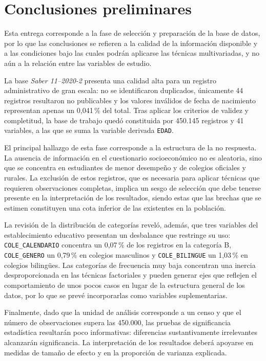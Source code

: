 \documentclass[12pt]{article}
\begin{document}
\section{Conclusiones preliminares}

Esta entrega corresponde a la fase de selección y preparación de la base de datos, por lo que las conclusiones se refieren a la calidad de la información disponible y a las condiciones bajo las cuales podrán aplicarse las técnicas multivariadas, y no aún a la relación entre las variables de estudio.

La base \textit{Saber 11--2020-2} presenta una calidad alta para un registro administrativo de gran escala: no se identificaron duplicados, únicamente 44 registros resultaron no publicables y los valores inválidos de fecha de nacimiento representan apenas un 0,041\,\% del total. Tras aplicar los criterios de validez y completitud, la base de trabajo quedó constituida por 450.145 registros y 41 variables, a las que se suma la variable derivada \texttt{EDAD}.

El principal hallazgo de esta fase corresponde a la estructura de la no respuesta. La ausencia de información en el cuestionario socioeconómico no es aleatoria, sino que se concentra en estudiantes de menor desempeño y de colegios oficiales y rurales. La exclusión de estos registros, que es necesaria para aplicar técnicas que requieren observaciones completas, implica un sesgo de selección que debe tenerse presente en la interpretación de los resultados, siendo estas que las brechas que se estimen constituyen una cota inferior de las existentes en la población.

La revisión de la distribución de categorías reveló, además, que tres variables del establecimiento educativo presentan un desbalance que restringe su uso: \texttt{COLE\_CALENDARIO} concentra un 0,07\,\% de los registros en la categoría B, \texttt{COLE\_GENERO} un 0,79\,\% en colegios masculinos y \texttt{COLE\_BILINGUE} un 1,03\,\% en colegios bilingües. Las categorías de frecuencia muy baja concentran una inercia desproporcionada en las técnicas factoriales y pueden generar ejes que reflejen el comportamiento de unos pocos casos en lugar de la estructura general de los datos, por lo que se prevé incorporarlas como variables suplementarias.

Finalmente, dado que la unidad de análisis corresponde a un censo y que el número de observaciones supera las 450.000, las pruebas de significancia estadística resultarán poco informativas: diferencias sustantivamente irrelevantes alcanzarán significancia. La interpretación de los resultados deberá apoyarse en medidas de tamaño de efecto y en la proporción de varianza explicada.
\end{document}
